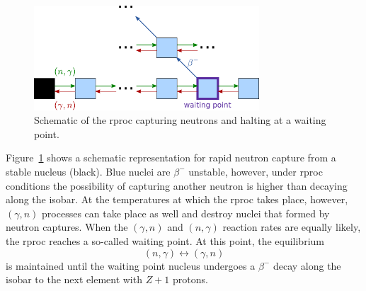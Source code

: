 \begin{figure}[tb]
    \centering
    \includegraphics[width=0.75\textwidth]{graphics/r-process/rproc_schematic}
    \caption{Schematic of the \ac{rproc} capturing neutrons and halting at a waiting point.}
    \label{fig:r-process:schematic_waiting_point}
\end{figure}
Figure~\ref{fig:r-process:schematic_waiting_point} shows a schematic representation for rapid neutron capture from a stable nucleus (black). Blue nuclei are $\beta^{-}$ unstable, however, under \ac{rproc} conditions the possibility of capturing another neutron is higher than decaying along the isobar. At the temperatures at which the \ac{rproc} takes place, however, $(\gamma,n)$ processes can take place as well and destroy nuclei that formed by neutron captures. When the $(\gamma,n)$ and $(n,\gamma)$ reaction rates are equally likely, the \ac{rproc} reaches a so-called waiting point. At this point, the equilibrium
\begin{equation}
    (n, \gamma) \longleftrightarrow (\gamma, n)
\end{equation}
is maintained until the waiting point nucleus undergoes a $\beta^{-}$ decay along the isobar to the next element with $Z+1$ protons.

